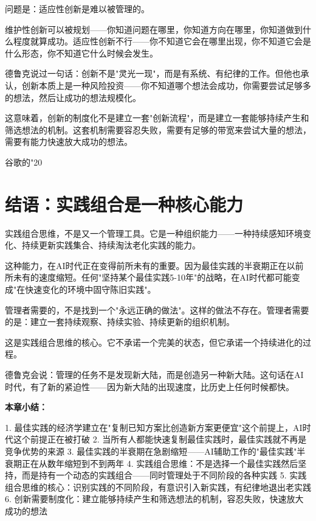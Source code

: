 问题是：适应性创新是难以被管理的。

维护性创新可以被规划——你知道问题在哪里，你知道方向在哪里，你知道做到什么程度就算成功。适应性创新不行——你不知道它会在哪里出现，你不知道它会是什么形态，你不知道它什么时候会发生。

德鲁克说过一句话：创新不是"灵光一现"，而是有系统、有纪律的工作。但他也承认，创新本质上是一种风险投资——你不知道哪个想法会成功，你需要尝试足够多的想法，然后让成功的想法规模化。

这意味着，创新的制度化不是建立一套"创新流程"，而是建立一套能够持续产生和筛选想法的机制。这套机制需要容忍失败，需要有足够的带宽来尝试大量的想法，需要有能力快速放大成功的想法。

谷歌的"20%

\section{结语：实践组合是一种核心能力}


实践组合思维，不是又一个管理工具。它是一种组织能力——一种持续感知环境变化、持续更新实践集合、持续淘汰老化实践的能力。

这种能力，在AI时代正在变得前所未有的重要。因为最佳实践的半衰期正在以前所未有的速度缩短。任何"坚持某个最佳实践5-10年"的战略，在AI时代都可能变成"在快速变化的环境中固守陈旧实践"。

管理者需要的，不是找到一个"永远正确的做法"。这样的做法不存在。管理者需要的是：建立一套持续观察、持续实验、持续更新的组织机制。

这是实践组合思维的核心。它不承诺一个完美的状态，但它承诺一个持续进化的过程。

德鲁克会说：管理的任务不是发现新大陆，而是创造另一种新大陆。这句话在AI时代，有了新的紧迫性——因为新大陆的出现速度，比历史上任何时候都快。


\textbf{本章小结：}

1. 最佳实践的经济学建立在"复制已知方案比创造新方案更便宜"这个前提上，AI时代这个前提正在被打破
2. 当所有人都能快速复制最佳实践时，最佳实践就不再是竞争优势的来源
3. 最佳实践的半衰期在急剧缩短——AI辅助工作的"最佳实践"半衰期正在从数年缩短到不到两年
4. 实践组合思维：不是选择一个最佳实践然后坚持，而是持有一个动态的实践组合——同时管理处于不同阶段的各种实践
5. 实践组合思维的核心：识别实践的不同阶段，有意识引入新实践，有纪律地退出老实践
6. 创新需要制度化：建立能够持续产生和筛选想法的机制，容忍失败，快速放大成功的想法
